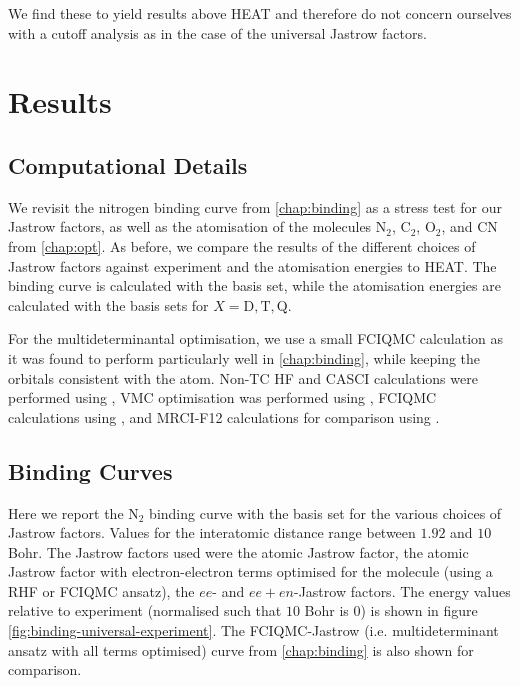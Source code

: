 We find these to yield results above HEAT and therefore do not concern ourselves with a cutoff analysis as in the case of the universal Jastrow factors.

\section{Results}

\subsection{Computational Details}

We revisit the nitrogen binding curve from \autoref{chap:binding} as a stress test for our Jastrow factors, as well as the atomisation of the molecules N$_2$, C$_2$, O$_2$, and CN from \autoref{chap:opt}. As before, we compare the results of the different choices of Jastrow factors against experiment\supercite{leroyAccurate2006} and the atomisation energies to HEAT.\supercite{fellerSurvey2008} The binding curve is calculated with the \avtz basis set, while the atomisation energies are calculated with the  basis sets for $X=\text{D},\text{T},\text{Q}$.

For the multideterminantal optimisation, we use a small FCIQMC calculation as it was found to perform particularly well in \autoref{chap:binding}, while keeping the orbitals consistent with the atom. Non-TC HF and CASCI calculations were performed using \pyscf,\supercite{sunPySCF2018} VMC optimisation was performed using \casino,\supercite{needsVariational2020} FCIQMC calculations using \neci,\supercite{gutherNECI2020} and MRCI-F12 calculations for comparison using \molpro.\supercite{wernerMOLPRO,wernerMolpro2012,wernerMolproQuantumChemistry2020}

\subsection{Binding Curves}

Here we report the N$_2$ binding curve with the \avtz basis set for the various choices of Jastrow factors. Values for the interatomic distance range between $1.92$ and $10$ Bohr. The Jastrow factors used were the atomic Jastrow factor, the atomic Jastrow factor with electron-electron terms optimised for the molecule (using a RHF or FCIQMC ansatz), the $ee$- and $ee+en$-Jastrow factors. The energy values relative to experiment (normalised such that $10$ Bohr is $0$) is shown in figure \ref{fig:binding-universal-experiment}. The FCIQMC-Jastrow (i.e. multideterminant ansatz with all terms optimised) curve from \autoref{chap:binding} is also shown for comparison.

